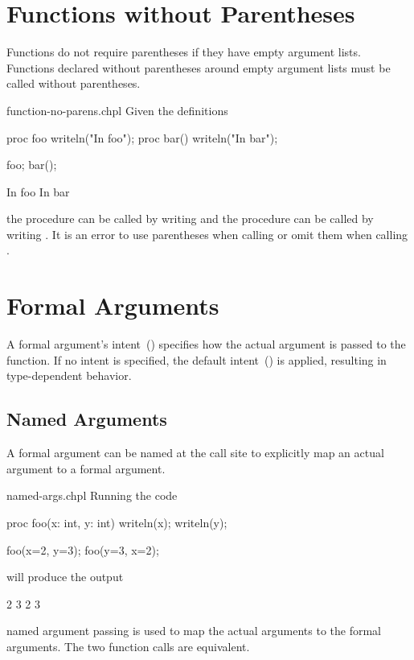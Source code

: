 \section{Functions without Parentheses}
\label{Functions_without_Parentheses}

Functions do not require parentheses if they have empty argument
lists.  Functions declared without parentheses around empty argument
lists must be called without parentheses.

\begin{chapelexample}{function-no-parens.chpl}
Given the definitions
\begin{chapel}
proc foo { writeln("In foo"); }
proc bar() { writeln("In bar"); }
\end{chapel}
\begin{chapelpost}
foo;
bar();
\end{chapelpost}
\begin{chapeloutput}
In foo
In bar
\end{chapeloutput}
the procedure  can be called by writing  and the
procedure  can be called by writing .  It is an
error to use parentheses when calling  or omit them
when calling .
\end{chapelexample}


\section{Formal Arguments}
\label{Formal_Arguments}

A formal argument's intent~() specifies how the
actual argument is passed to the function.  If no intent is specified,
the default intent~() is applied, resulting in
type-dependent behavior.

\subsection{Named Arguments}
\label{Named_Arguments}

A formal argument can be named at the call site to explicitly map an
actual argument to a formal argument.

\begin{chapelexample}{named-args.chpl}
Running the code
\begin{chapel}
proc foo(x: int, y: int) { writeln(x); writeln(y); }

foo(x=2, y=3);
foo(y=3, x=2);
\end{chapel}
will produce the output
\begin{chapelprintoutput}{}
2
3
2
3
\end{chapelprintoutput}
named argument passing is used to map the actual arguments to the
formal arguments.  The two function calls are equivalent.
\end{chapelexample}

